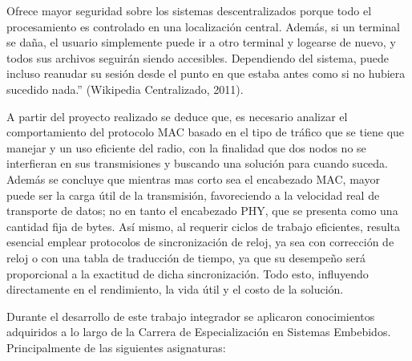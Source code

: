 Ofrece mayor seguridad sobre los sistemas descentralizados porque todo el procesamiento es controlado en una localización central. Además, si un terminal se daña, el usuario simplemente puede ir a otro terminal y logearse de nuevo, y todos sus archivos seguirán siendo accesibles. Dependiendo del sistema, puede incluso reanudar su sesión desde el punto en que estaba antes como si no hubiera sucedido nada.” (Wikipedia Centralizado, 2011).

A partir del proyecto realizado se deduce que, es necesario analizar el comportamiento del protocolo MAC basado en el tipo de tráfico que se tiene que manejar y un uso eficiente del radio, con la finalidad que dos nodos no se interfieran en sus transmisiones y buscando una solución para cuando suceda. Además se concluye que mientras mas corto sea el encabezado MAC, mayor puede ser la carga útil de la transmisión, favoreciendo a la velocidad real de transporte de datos; no en tanto el encabezado PHY, que se presenta como una cantidad fija de bytes. Así mismo, al requerir ciclos de trabajo eficientes, resulta esencial emplear protocolos de sincronización de reloj, ya sea con corrección de reloj o con una tabla de traducción de tiempo, ya que su desempeño será proporcional a la exactitud de dicha sincronización. Todo esto, influyendo directamente en el rendimiento, la vida útil y el costo de la solución.


\medskip
Durante el desarrollo de este trabajo integrador se aplicaron conocimientos adquiridos a lo largo de la Carrera de Especialización en Sistemas Embebidos. Principalmente de las siguientes asignaturas: 

